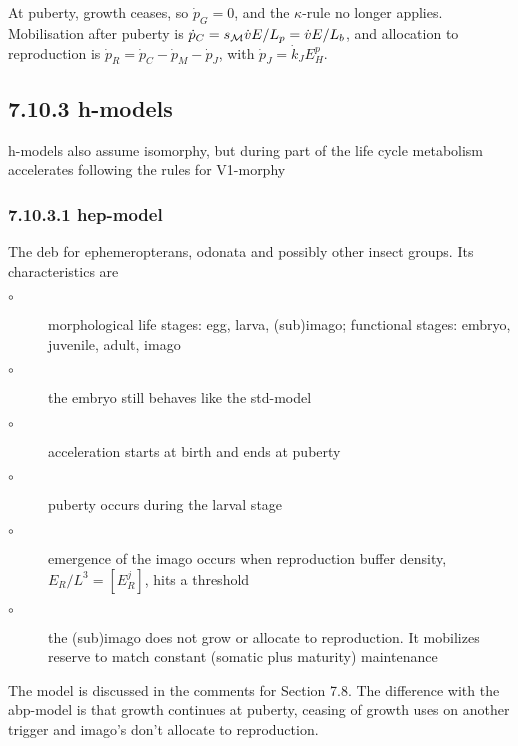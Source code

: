At puberty, growth ceases, so $\dot{p}_G = 0$, and the $\kappa$-rule no longer applies. 
Mobilisation after puberty is $\dot{p}_C = s_{\cal M} \dot{v} E/ L_p = \dot{v} E/ L_b$, 
  and allocation to reproduction is $\dot{p}_R = \dot{p}_C - \dot{p}_M - \dot{p}_J$, with $\dot{p}_J = \dot{k}_J E_H^p$.

\subsection*{7.10.3 h-models}
{}
\label{sec_c:h-models}

h-models also assume isomorphy, but during part of the life cycle metabolism accelerates following the rules for V1-morphy

\subsubsection*{7.10.3.1 hep-model}
{}
\label{sec_c:hep}

The  {\sc deb} for ephemeropterans, odonata and possibly other insect groups. 
Its characteristics are
\begin{description}
  \item[$\circ$] morphological life stages: egg, larva, (sub)imago; functional stages: embryo, juvenile, adult, imago
	
  \item[$\circ$] the embryo still behaves like the std-model
	
  \item[$\circ$] acceleration starts at birth and ends at puberty
	
  \item[$\circ$] puberty occurs during the larval stage
	
  \item[$\circ$] emergence of the imago occurs when reproduction buffer density, $E_R/ L^3 = [E_R^j]$, hits a threshold
	
  \item[$\circ$] the (sub)imago does not grow or allocate to reproduction. 
	  It mobilizes reserve to match constant (somatic plus maturity) maintenance
\end{description}
The model is discussed in the comments for Section 7.8.
The difference with the abp-model is that growth continues at puberty, ceasing of growth uses on another trigger and imago's don't allocate to reproduction.

